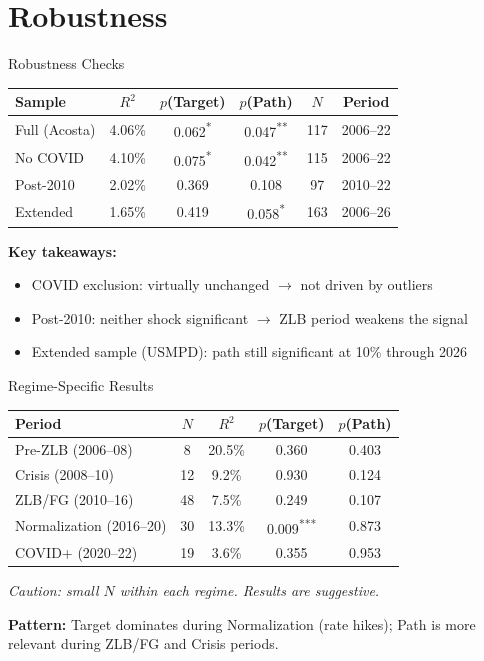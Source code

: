 \documentclass[aspectratio=169, 11pt]{beamer}
\begin{document}
\section{Robustness}

\begin{frame}{Robustness Checks}
\begin{tabular}{lccccc}
\toprule
Sample & $R^2$ & $p$(Target) & $p$(Path) & $N$ & Period \\
\midrule
Full (Acosta) & 4.06\% & 0.062\textsuperscript{*} & 0.047\textsuperscript{**} & 117 & 2006--22 \\
No COVID & 4.10\% & 0.075\textsuperscript{*} & 0.042\textsuperscript{**} & 115 & 2006--22 \\
Post-2010 & 2.02\% & 0.369 & 0.108 & 97 & 2010--22 \\
Extended & 1.65\% & 0.419 & 0.058\textsuperscript{*} & 163 & 2006--26 \\
\bottomrule
\end{tabular}

\vspace{0.8em}
\textbf{Key takeaways:}
\begin{itemize}
  \item COVID exclusion: virtually unchanged $\rightarrow$ not driven by outliers
  \item Post-2010: neither shock significant $\rightarrow$ ZLB period weakens the signal
  \item Extended sample (USMPD): path still significant at 10\% through 2026
\end{itemize}
\end{frame}

\begin{frame}{Regime-Specific Results}
\begin{tabular}{lcccc}
\toprule
Period & $N$ & $R^2$ & $p$(Target) & $p$(Path) \\
\midrule
Pre-ZLB (2006--08) & 8 & 20.5\% & 0.360 & 0.403 \\
Crisis (2008--10) & 12 & 9.2\% & 0.930 & 0.124 \\
ZLB/FG (2010--16) & 48 & 7.5\% & 0.249 & 0.107 \\
Normalization (2016--20) & 30 & 13.3\% & 0.009\textsuperscript{***} & 0.873 \\
COVID+ (2020--22) & 19 & 3.6\% & 0.355 & 0.953 \\
\bottomrule
\end{tabular}

\vspace{0.5em}
\small\textit{Caution: small $N$ within each regime. Results are suggestive.}

\vspace{0.3em}
\textbf{Pattern:} Target dominates during Normalization (rate hikes); Path is more relevant during ZLB/FG and Crisis periods.
\end{frame}
\end{document}

